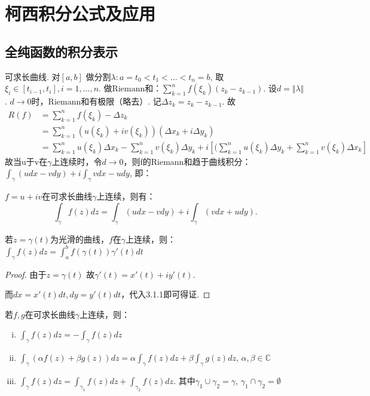 \chapter{柯西积分公式及应用}

\section{全纯函数的积分表示}
可求长曲线. 对$[a,b]$ 做分割$\lambda : a = t_0 < t_1 < ... < t_n = b$, 取$\xi_i \in [t_{i-1}, t_i], i=1,...,n$.
做Riemann和：$\sum_{k=1} ^{n} f(\xi_k) (z_k - z_{k-1})$. 设$d=\Vert  \lambda \Vert$. $d \rightarrow 0$时，Riemann和有极限（略去）. 记$\Delta z_k = z_k - z_{k-1}$. 故
\begin{align*}
R(f) &= \sum_{k=1}^{n}f(\xi_k) - \Delta z_k \\
&= \sum_{k=1}^{n} (u(\xi_k) + i v(\xi_k))(\Delta x_k + i \Delta y_k) \\
&= \sum_{k=1} ^{n} u(\xi_k) \Delta x_k - \sum_{k=1}^{n} v(\xi_k) \Delta y_k + i [(\sum_{k=1}^{n} u(\xi_k) \Delta y_k + \sum_{k=1}^n v(\xi_k) \Delta x_k]
\end{align*}
故当u于v在$\gamma$上连续时，令$d \rightarrow 0$，则f的Riemann和趋于曲线积分：$\int_{\gamma} (udx - vdy) + i \int_{\gamma}vdx-udy$, 即： 
\begin{mypro}
	$f = u+iv$在可求长曲线$\gamma$上连续，则有：
	$$\int_\gamma f(z) dz = \int_\gamma (udx-vdy) + i\int_\gamma (vdx+udy).$$
\end{mypro}
\begin{mypro}
	若$z=\gamma(t)$为光滑的曲线，$f$在$\gamma$上连续，则：$\int_\gamma f(z)dz = \int_a^b f(\gamma(t))\gamma'(t) dt$
\end{mypro}
\begin{proof}
	由于$z=\gamma(t)$ 故$\gamma'(t)=x'(t) + i y'(t)$.
	
	而$dx=x'(t)dt, dy = y'(t)dt$，代入3.1.1即可得证.
\end{proof}

\begin{mypro}
	若$f, g$在可求长曲线$\gamma$上连续，则：
	\begin{enumerate}[i)]
		\item $\int_\gamma f(z)dz = -\int_\gamma f(z)dz$
		\item $\int_\gamma (\alpha f(z) + \beta g(z)) dz = \alpha \int_\gamma f(z) dz + \beta \int_\gamma g(z) dz$, \quad $\alpha, \beta \in \mathbb{C}$
		\item $\int_\gamma f(z) dz = \int_{\gamma_1} f(z) dz + \int_{\gamma_2} f(z) dz$. 其中$\gamma_1 \cup \gamma_2 = \gamma$, $\gamma_1 \cap \gamma_2 = \emptyset $
	\end{enumerate}
\end{mypro}

